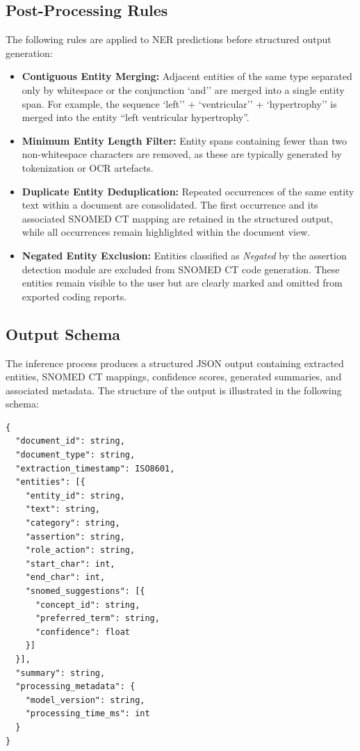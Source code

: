 \subsection{Post-Processing Rules}

The following rules are applied to NER predictions before structured output generation:

\begin{itemize}

\item \textbf{Contiguous Entity Merging:} Adjacent entities of the same type separated only by whitespace or the conjunction `and'' are merged into a single entity span. For example, the sequence `left'' + `ventricular'' + `hypertrophy'' is merged into the entity ``left ventricular hypertrophy''.

\item \textbf{Minimum Entity Length Filter:} Entity spans containing fewer than two non-whitespace characters are removed, as these are typically generated by tokenization or OCR artefacts.

\item \textbf{Duplicate Entity Deduplication:} Repeated occurrences of the same entity text within a document are consolidated. The first occurrence and its associated SNOMED CT mapping are retained in the structured output, while all occurrences remain highlighted within the document view.

\item \textbf{Negated Entity Exclusion:} Entities classified as \textit{Negated} by the assertion detection module are excluded from SNOMED CT code generation. These entities remain visible to the user but are clearly marked and omitted from exported coding reports.

\end{itemize}

\subsection{Output Schema}

The inference process produces a structured JSON output containing extracted entities, SNOMED CT mappings, confidence scores, generated summaries, and associated metadata. The structure of the output is illustrated in the following schema:

\begin{verbatim}
{
  "document_id": string,
  "document_type": string,
  "extraction_timestamp": ISO8601,
  "entities": [{
    "entity_id": string,
    "text": string,
    "category": string,
    "assertion": string,
    "role_action": string,
    "start_char": int,
    "end_char": int,
    "snomed_suggestions": [{
      "concept_id": string,
      "preferred_term": string,
      "confidence": float
    }]
  }],
  "summary": string,
  "processing_metadata": {
    "model_version": string,
    "processing_time_ms": int
  }
}
\end{verbatim}

